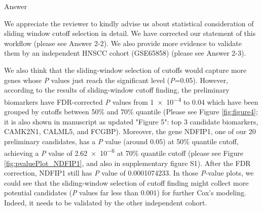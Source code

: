 \documentclass[preprint,12pt]{elsarticle}
\newenvironment{MyColorPar}[1]{%
    \leavevmode\color{#1}\ignorespaces%
}{%
}%
\begin{document}
%
\begin{MyColorPar}{blue}
Answer

We appreciate the reviewer to kindly advise us about statistical consideration of sliding window cutoff selection in detail.
We have corrected our statement of this workflow (please see Answer 2-2).
We also provide more evidence to validate them by an independent HNSCC cohort (GSE65858) (please see Answer 2-3).

We also think that the sliding-window selection of cutoffs would capture more genes whose \textit{P} values just reach the significant level (\textit{P}=0.05).
However, according to the results of sliding-window cutoff finding, the preliminary biomarkers have FDR-corrected \textit{P} values from \num{1e-4} to 0.04 which have been grouped by cutoffs between 50\% and 70\% quantile (Please see Figure \ref{fig:figure4}; it is also shown in manuscript as updated "Figure 5": top 3 candidate biomarkers, CAMK2N1, CALML5, and FCGBP).
Moreover, the gene NDFIP1, one of our 20 preliminary candidates, has a \textit{P} value (around $0.05$) at 50\% quantile cutoff, achieving a \textit{P} value of \num{2.62e-6} at 70\% quantile cutoff (please see Figure \ref{fig:pvaluePlot_NDFIP1}, and also in 
supplementary figure S1). After the FDR correction, NDFIP1 still has \textit{P} value of \num[round-precision=3, round-mode=figures,
scientific-notation=true]{0.0001074233}.
In those \textit{P}-value plots, we could see that the sliding-window selection of cutoff finding might collect more potential candidates (\textit{P} values far less than $0.001$) for further Cox's modeling.
Indeed, it needs to be validated by the other independent cohort.



\end{MyColorPar}
\end{document}
